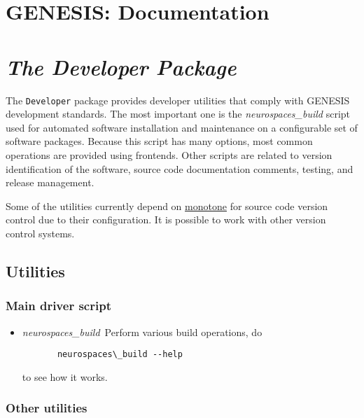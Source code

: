 \documentclass[12pt]{article}
\begin{document}
\section*{GENESIS: Documentation}

\section*{\it The Developer Package}

The {\tt Developer} package provides developer utilities that comply
with GENESIS development standards. The most important one is the {\it
  neurospaces\_build} script used for automated software installation
and maintenance on a configurable set of software packages.  Because
this script has many options, most common operations are provided
using frontends.  Other scripts are related to version identification
of the software, source code documentation comments, testing, and
release management.

Some of the utilities currently depend on \href{http://monotone.ca}{monotone} for source code version control due to their configuration. It is possible to work with other version control systems.

\subsection*{Utilities}

\subsubsection*{Main driver script}

\begin{itemize}
	\item {\it neurospaces\_build}\,\,\,Perform various build operations, do 
	\begin{verbatim}
	   neurospaces\_build --help
	\end{verbatim}
	   to see how it works. 
\end{itemize} 


\subsubsection*{Other utilities}
\end{document}
